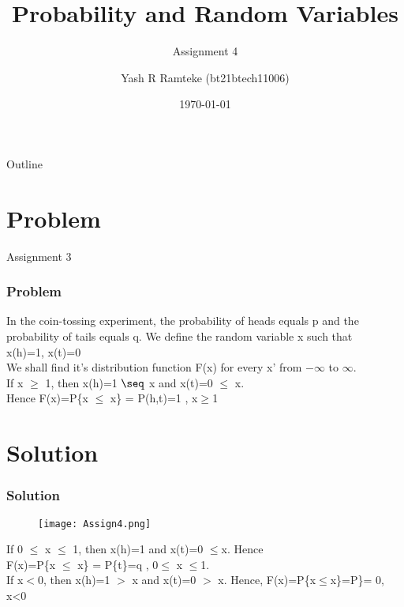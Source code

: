 \documentclass{beamer}
\title{Probability and Random Variables}
\subtitle{Assignment 4}
\author{Yash R Ramteke (bt21btech11006)}
\date{\today}
\begin{document}
\begin{frame}
    \titlepage 
\end{frame}

\begin{frame}{Outline}
    \tableofcontents
\end{frame}

\section{Problem}

\begin{frame}{Assignment 3}
  \frametitle{Problem}
 In the coin-tossing experiment, the probability of heads equals p and the probability of tails equals q. We define the random variable x such that\\
x(h)=1, x(t)=0\\
We shall find it's distribution function F(x) for every x' from $-\infty$ to $\infty$.\\
If x $\geq$ 1, then x(h)=1 $\seq$ x and x(t)=0 $\leq$ x.\\
Hence F(x)=P\{x $\leq$ x\} = P(h,t)=1 , x$\geq$1
 \end{frame}
  
\section{Solution}
\begin{frame}
\frametitle{Solution}
\begin{figure}[h]
    \texttt{[image: Assign4.png]}
     
\end{figure}
If 0 $\leq$ x $\leq$ 1, then x(h)=1 and x(t)=0 $\leq$x. Hence\\
F(x)=P\{x $\leq$ x\} = P\{t\}=q , 0$\leq$ x $\leq$1.\\
If x$<$0, then x(h)=1 $>$ x and x(t)=0 $>$ x. Hence,
F(x)=P\{x$\leq$x\}=P\theta\}= 0, x<0
\end{frame}
\end{document}
